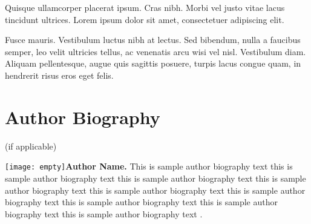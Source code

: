 \documentclass[proof]{WileyASNA-v1}
\begin{document}
Quisque ullamcorper placerat ipsum. Cras nibh. Morbi vel justo vitae lacus tincidunt ultrices. Lorem ipsum dolor sit
amet, consectetuer adipiscing elit. 

Fusce mauris. Vestibulum luctus nibh at lectus. Sed bibendum, nulla a faucibus semper, leo velit ultricies tellus, ac
venenatis arcu wisi vel nisl. Vestibulum diam. Aliquam pellentesque, augue quis sagittis posuere, turpis lacus congue
quam, in hendrerit risus eros eget felis. 

\nocite{*}%
%


\section*{Author Biography}
(if applicable)

\begin{biography}{\texttt{[image: empty]}}{\textbf{Author Name.} This is sample author biography text this is sample author biography text this is sample author biography text this is sample author biography text this is sample author biography text this is sample author biography text this is sample author biography text this is sample author biography text this is sample author biography text .}
\end{biography}
\end{document}
